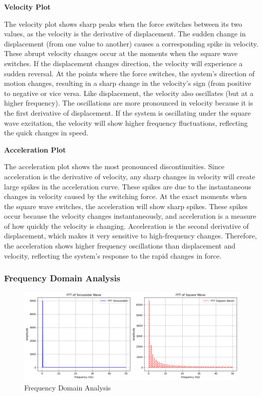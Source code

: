 \documentclass[12pt,a4paper]{article}
\begin{document}
\noindent\textbf{Velocity Plot}  

The velocity plot shows sharp peaks when the force switches between its two values, as the velocity is the derivative of displacement. The sudden change in displacement (from one value to another) causes a corresponding spike in velocity. These abrupt velocity changes occur at the moments when the square wave switches. If the displacement changes direction, the velocity will experience a sudden reversal. At the points where the force switches, the system’s direction of motion changes, resulting in a sharp change in the velocity's sign (from positive to negative or vice versa. Like displacement, the velocity also oscillates (but at a higher frequency). The oscillations are more pronounced in velocity because it is the first derivative of displacement. If the system is oscillating under the square wave excitation, the velocity will show higher frequency fluctuations, reflecting the quick changes in speed.
\vspace{5pt}

\noindent\textbf{Acceleration Plot}

The acceleration plot shows the most pronounced discontinuities. Since acceleration is the derivative of velocity, any sharp changes in velocity will create large spikes in the acceleration curve. These spikes are due to the instantaneous changes in velocity caused by the switching force. At the exact moments when the square wave switches, the acceleration will show sharp spikes. These spikes occur because the velocity changes instantaneously, and acceleration is a measure of how quickly the velocity is changing. Acceleration is the second derivative of displacement, which makes it very sensitive to high-frequency changes. Therefore, the acceleration shows higher frequency oscillations than displacement and velocity, reflecting the system's response to the rapid changes in force.
{\vspace{10pt}}

\subsubsection{Frequency Domain Analysis}
\begin{figure}[H]
    \centering
    \includegraphics[width=1\textwidth]{freq_domain.png} 
    \caption{Frequency Domain Analysis}
    \label{fig:system}
\end{figure}
{\vspace{10pt}}
\end{document}
